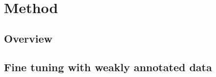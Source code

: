 \section{Method}
\label{sec:method}

\subsection{Overview}
\label{subsec:overview}

\subsection{Fine tuning with weakly annotated data}
\label{subsec:sys_augmentation}